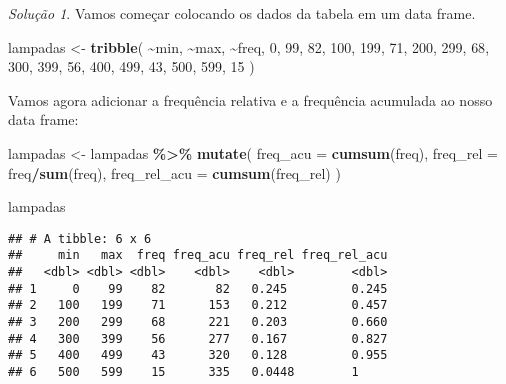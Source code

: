 \documentclass[
]{latex/krantz}
\newenvironment{Shaded}{\begin{snugshade}}{\end{snugshade}}
\newcommand{\AttributeTok}[1]{\textcolor[rgb]{0.13,0.29,0.53}{#1}}
\newcommand{\DecValTok}[1]{\textcolor[rgb]{0.00,0.00,0.81}{#1}}
\newcommand{\FunctionTok}[1]{\textcolor[rgb]{0.13,0.29,0.53}{\textbf{#1}}}
\newcommand{\NormalTok}[1]{#1}
\newcommand{\OtherTok}[1]{\textcolor[rgb]{0.56,0.35,0.01}{#1}}
\newcommand{\SpecialCharTok}[1]{\textcolor[rgb]{0.81,0.36,0.00}{\textbf{#1}}}
\theoremstyle{definition}
\theoremstyle{definition}
\theoremstyle{definition}
\theoremstyle{definition}
\theoremstyle{remark}
\newtheorem*{solution}{Solução}
\begin{document}
\begin{solution}

Vamos começar colocando os dados da tabela em um data frame.

\begin{Shaded}
\begin{Highlighting}[]
\NormalTok{lampadas }\OtherTok{\textless{}{-}} \FunctionTok{tribble}\NormalTok{(}
  \SpecialCharTok{\textasciitilde{}}\NormalTok{min, }\SpecialCharTok{\textasciitilde{}}\NormalTok{max, }\SpecialCharTok{\textasciitilde{}}\NormalTok{freq,}
  \DecValTok{0}\NormalTok{, }\DecValTok{99}\NormalTok{, }\DecValTok{82}\NormalTok{,}
  \DecValTok{100}\NormalTok{, }\DecValTok{199}\NormalTok{, }\DecValTok{71}\NormalTok{,}
  \DecValTok{200}\NormalTok{, }\DecValTok{299}\NormalTok{, }\DecValTok{68}\NormalTok{,}
  \DecValTok{300}\NormalTok{, }\DecValTok{399}\NormalTok{, }\DecValTok{56}\NormalTok{,}
  \DecValTok{400}\NormalTok{, }\DecValTok{499}\NormalTok{, }\DecValTok{43}\NormalTok{,}
  \DecValTok{500}\NormalTok{, }\DecValTok{599}\NormalTok{, }\DecValTok{15}
\NormalTok{)}
\end{Highlighting}
\end{Shaded}

Vamos agora adicionar a frequência relativa e a frequência acumulada ao nosso data frame:

\begin{Shaded}
\begin{Highlighting}[]
\NormalTok{lampadas }\OtherTok{\textless{}{-}}\NormalTok{ lampadas }\SpecialCharTok{\%\textgreater{}\%}
                \FunctionTok{mutate}\NormalTok{(}
                  \AttributeTok{freq\_acu =} \FunctionTok{cumsum}\NormalTok{(freq),}
                  \AttributeTok{freq\_rel =}\NormalTok{ freq}\SpecialCharTok{/}\FunctionTok{sum}\NormalTok{(freq),}
                  \AttributeTok{freq\_rel\_acu =} \FunctionTok{cumsum}\NormalTok{(freq\_rel)}
\NormalTok{                )}

\NormalTok{lampadas}
\end{Highlighting}
\end{Shaded}

\begin{verbatim}
## # A tibble: 6 x 6
##     min   max  freq freq_acu freq_rel freq_rel_acu
##   <dbl> <dbl> <dbl>    <dbl>    <dbl>        <dbl>
## 1     0    99    82       82   0.245         0.245
## 2   100   199    71      153   0.212         0.457
## 3   200   299    68      221   0.203         0.660
## 4   300   399    56      277   0.167         0.827
## 5   400   499    43      320   0.128         0.955
## 6   500   599    15      335   0.0448        1
\end{verbatim}


\end{solution}
\end{document}
